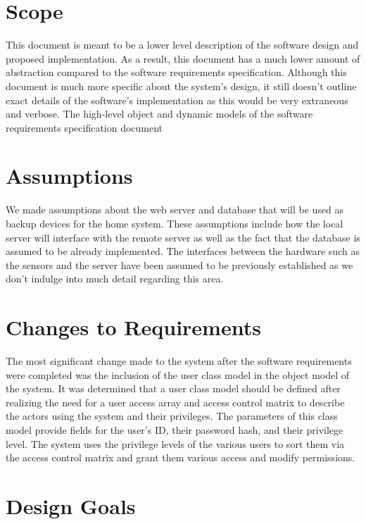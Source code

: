 \documentclass{report}
\begin{document}
\section{Scope}

This document is meant to be a lower level description of the software design
and proposed implementation. As a result, this document has a much lower amount
of abstraction compared to the software requirements specification. Although this
document is much more specific about the system's design, it still doesn't outline
exact details of the software's implementation as this would be very extraneous
and verbose. The high-level object and dynamic models of the software requirements
specification document

\section{Assumptions}

We made assumptions about the web server and database that will be used as
backup devices for the home system. These assumptions include how the local
server will interface with the remote server as well as the fact that the database
is assumed to be already implemented. The interfaces between the hardware such
as the sensors and the server have been assumed to be previously established
as we don't indulge into much detail regarding this area.

\section{Changes to Requirements}

The most significant change made to the system after the software requirements
were completed was the inclusion of the user class model in the object model of
the system. It was determined that a user class model should be defined after
realizing the need for a user access array and access control matrix to describe
the actors using the system and their privileges. The parameters of this class
model provide fields for the user's ID, their password hash, and their privilege
level. The system uses the privilege levels of the various users to sort them
via the access control matrix and grant them various access and modify 
permissions.

\section{Design Goals}
\end{document}
